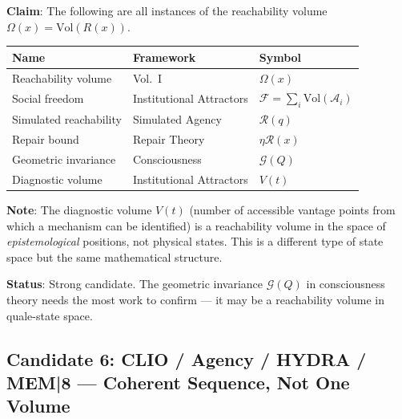 \documentclass[11pt, a4paper]{article}
\begin{document}
\begin{candbox}
\textbf{Claim}: The following are all instances of the reachability
volume $\Omega(x) = \mathrm{Vol}(R(x))$.

\medskip
\begin{tabular}{lll}
\textbf{Name} & \textbf{Framework} & \textbf{Symbol} \\
\hline
Reachability volume & Vol.~I & $\Omega(x)$ \\
Social freedom & Institutional Attractors & $\mathcal{F} = \sum_i
  \mathrm{Vol}(\mathcal{A}_i)$ \\
Simulated reachability & Simulated Agency & $\mathcal{R}(q)$ \\
Repair bound & Repair Theory & $\eta\mathcal{R}(x)$ \\
Geometric invariance & Consciousness & $\mathcal{G}(Q)$ \\
Diagnostic volume & Institutional Attractors & $V(t)$ \\
\end{tabular}

\medskip
\textbf{Note}: The diagnostic volume $V(t)$ (number of accessible
vantage points from which a mechanism can be identified) is a
reachability volume in the space of \emph{epistemological} positions,
not physical states. This is a different type of state space but the
same mathematical structure.

\medskip
\textbf{Status}: Strong candidate. The geometric invariance
$\mathcal{G}(Q)$ in consciousness theory needs the most work to
confirm --- it may be a reachability volume in quale-state space.
\end{candbox}

\subsection{Candidate 6: CLIO / Agency / HYDRA / MEM|8 --- Coherent Sequence, Not One Volume}
\end{document}
